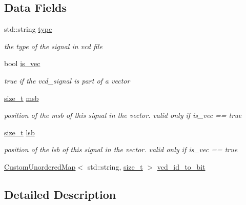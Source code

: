\subsection*{Data Fields}
\begin{DoxyCompactItemize}
\item 
std\+::string \hyperlink{classvcd__sig__info_aa1ed1c0a54a70f15c91fb481ceb6dd0d}{type}
\begin{DoxyCompactList}\small\item\em the type of the signal in vcd file \end{DoxyCompactList}\item 
bool \hyperlink{classvcd__sig__info_a3ea93985f431bd1fca7dadce2b0b8b46}{is\+\_\+vec}
\begin{DoxyCompactList}\small\item\em true if the vcd\+\_\+signal is part of a vector \end{DoxyCompactList}\item 
\hyperlink{tutorial__fpt__2017_2intro_2sixth_2test_8c_a7c94ea6f8948649f8d181ae55911eeaf}{size\+\_\+t} \hyperlink{classvcd__sig__info_a70cf9ed072ef283fbb3eb7f20f5979ac}{msb}
\begin{DoxyCompactList}\small\item\em position of the msb of this signal in the vector. valid only if is\+\_\+vec == true \end{DoxyCompactList}\item 
\hyperlink{tutorial__fpt__2017_2intro_2sixth_2test_8c_a7c94ea6f8948649f8d181ae55911eeaf}{size\+\_\+t} \hyperlink{classvcd__sig__info_a953e888527567548c93f1d4ee28110ed}{lsb}
\begin{DoxyCompactList}\small\item\em position of the lsb of this signal in the vector. valid only if is\+\_\+vec == true \end{DoxyCompactList}\item 
\hyperlink{custom__map_8hpp_ad1ed68f2ff093683ab1a33522b144adc}{Custom\+Unordered\+Map}$<$ std\+::string, \hyperlink{tutorial__fpt__2017_2intro_2sixth_2test_8c_a7c94ea6f8948649f8d181ae55911eeaf}{size\+\_\+t} $>$ \hyperlink{classvcd__sig__info_a2ec11429997b0aec842b34d1abe14852}{vcd\+\_\+id\+\_\+to\+\_\+bit}
\end{DoxyCompactItemize}


\subsection{Detailed Description}


